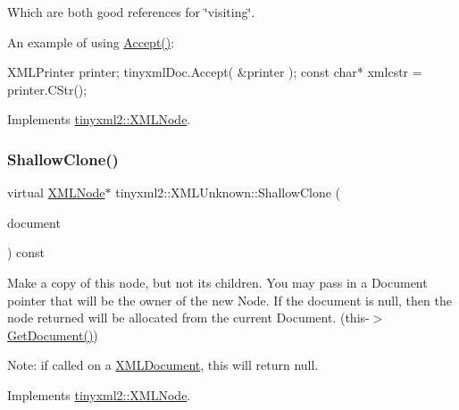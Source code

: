 Which are both good references for \char`\"{}visiting\char`\"{}.

An example of using \mbox{\hyperlink{classtinyxml2_1_1XMLUnknown_a70983aa1b1cff3d3aa6d4d0a80e5ee48}{Accept()}}\+: \begin{DoxyVerb}XMLPrinter printer;
tinyxmlDoc.Accept( &printer );
const char* xmlcstr = printer.CStr();
\end{DoxyVerb}
 

Implements \mbox{\hyperlink{classtinyxml2_1_1XMLNode_a81e66df0a44c67a7af17f3b77a152785}{tinyxml2\+::\+X\+M\+L\+Node}}.

\mbox{\label{classtinyxml2_1_1XMLUnknown_a0125f41c89763dea06619b5fd5246b4c}} 
\subsubsection{\texorpdfstring{ShallowClone()}{ShallowClone()}}
{\footnotesize\ttfamily virtual \mbox{\hyperlink{classtinyxml2_1_1XMLNode}{X\+M\+L\+Node}}$\ast$ tinyxml2\+::\+X\+M\+L\+Unknown\+::\+Shallow\+Clone (\begin{DoxyParamCaption}\item[{\mbox{\hyperlink{classtinyxml2_1_1XMLDocument}{X\+M\+L\+Document}} $\ast$}]{document }\end{DoxyParamCaption}) const\hspace{0.3cm}{\ttfamily [virtual]}}

Make a copy of this node, but not its children. You may pass in a Document pointer that will be the owner of the new Node. If the \textquotesingle{}document\textquotesingle{} is null, then the node returned will be allocated from the current Document. (this-\/$>$\mbox{\hyperlink{classtinyxml2_1_1XMLNode_af343d1ef0b45c0020e62d784d7e67a68}{Get\+Document()}})

Note\+: if called on a \mbox{\hyperlink{classtinyxml2_1_1XMLDocument}{X\+M\+L\+Document}}, this will return null. 

Implements \mbox{\hyperlink{classtinyxml2_1_1XMLNode_a8402cbd3129d20e9e6024bbcc0531283}{tinyxml2\+::\+X\+M\+L\+Node}}.

\mbox{\label{classtinyxml2_1_1XMLUnknown_a0715ab2c05d7f74845c188122213b116}} 
